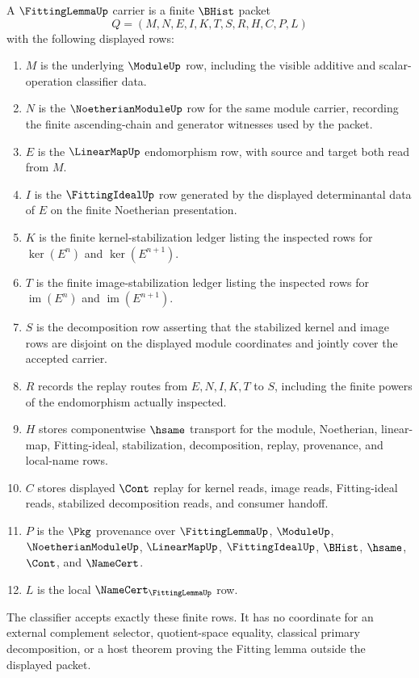 \begin{definition}
\label{def:fitting-lemma-carrier}
A $\FittingLemmaUp$ carrier is a finite $\BHist$ packet
$$
Q=(M,N,E,I,K,T,S,R,H,C,P,L)
$$
with the following displayed rows:
\begin{enumerate}
\item $M$ is the underlying $\ModuleUp$ row, including the visible additive and scalar-operation classifier data.
\item $N$ is the $\NoetherianModuleUp$ row for the same module carrier, recording the finite ascending-chain and generator witnesses used by the packet.
\item $E$ is the $\LinearMapUp$ endomorphism row, with source and target both read from $M$.
\item $I$ is the $\FittingIdealUp$ row generated by the displayed determinantal data of $E$ on the finite Noetherian presentation.
\item $K$ is the finite kernel-stabilization ledger listing the inspected rows for $\ker(E^n)$ and $\ker(E^{n+1})$.
\item $T$ is the finite image-stabilization ledger listing the inspected rows for $\operatorname{im}(E^n)$ and $\operatorname{im}(E^{n+1})$.
\item $S$ is the decomposition row asserting that the stabilized kernel and image rows are disjoint on the displayed module coordinates and jointly cover the accepted carrier.
\item $R$ records the replay routes from $E,N,I,K,T$ to $S$, including the finite powers of the endomorphism actually inspected.
\item $H$ stores componentwise $\hsame$ transport for the module, Noetherian, linear-map, Fitting-ideal, stabilization, decomposition, replay, provenance, and local-name rows.
\item $C$ stores displayed $\Cont$ replay for kernel reads, image reads, Fitting-ideal reads, stabilized decomposition reads, and consumer handoff.
\item $P$ is the $\Pkg$ provenance over $\FittingLemmaUp$, $\ModuleUp$, $\NoetherianModuleUp$, $\LinearMapUp$, $\FittingIdealUp$, $\BHist$, $\hsame$, $\Cont$, and $\NameCert$.
\item $L$ is the local $\NameCert_{\FittingLemmaUp}$ row.
\end{enumerate}
The classifier accepts exactly these finite rows. It has no coordinate for an external complement selector, quotient-space equality, classical primary decomposition, or a host theorem proving the Fitting lemma outside the displayed packet.
\end{definition}

